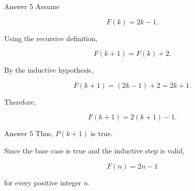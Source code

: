 \begin{frame}{Answer 5}
Assume

$$
F(k)=2k-1.
$$

Using the recursive definition,

$$
F(k+1)=F(k)+2.
$$

By the inductive hypothesis,

$$
F(k+1)
=
(2k-1)+2
=
2k+1.
$$

Therefore,

$$
F(k+1)=2(k+1)-1.
$$

\end{frame}

\begin{frame}{Answer 5}
Thus, $P(k+1)$ is true.

Since the base case is true and the inductive step is valid,

$$
\boxed{F(n)=2n-1}
$$

for every positive integer $n$.
\end{frame}
